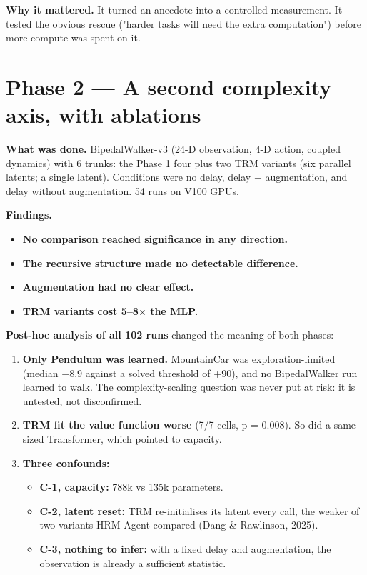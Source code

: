 \documentclass[11pt]{article}
\begin{document}
\textbf{Why it mattered.} It turned an anecdote into a controlled measurement. It tested the obvious rescue ("harder tasks will need the extra computation") before more compute was spent on it.



\medskip



\section*{Phase 2 --- A second complexity axis, with ablations}



\textbf{What was done.} BipedalWalker-v3 (24-D observation, 4-D action, coupled dynamics) with 6 trunks: the Phase 1 four plus two TRM variants (six parallel latents; a single latent). Conditions were no delay, delay + augmentation, and delay without augmentation. 54 runs on V100 GPUs.



\textbf{Findings.}

\begin{itemize}
\item \textbf{No comparison reached significance in any direction.}
\item \textbf{The recursive structure made no detectable difference.}
\item \textbf{Augmentation had no clear effect.}
\item \textbf{TRM variants cost 5--8$\times$ the MLP.}
\end{itemize}



\textbf{Post-hoc analysis of all 102 runs} changed the meaning of both phases:

\begin{enumerate}
\item \textbf{Only Pendulum was learned.} MountainCar was exploration-limited (median $-$8.9 against a solved threshold of +90), and no BipedalWalker run learned to walk. The complexity-scaling question was never put at risk: it is untested, not disconfirmed.
\item \textbf{TRM fit the value function worse} (7/7 cells, p = 0.008). So did a same-sized Transformer, which pointed to capacity.
\item \textbf{Three confounds:}
\begin{itemize}
\item \textbf{C-1, capacity:} 788k vs 135k parameters.
\item \textbf{C-2, latent reset:} TRM re-initialises its latent every call, the weaker of two variants HRM-Agent compared (Dang \& Rawlinson, 2025).
\item \textbf{C-3, nothing to infer:} with a fixed delay and augmentation, the observation is already a sufficient statistic.
\end{itemize}
\end{enumerate}
\end{document}
